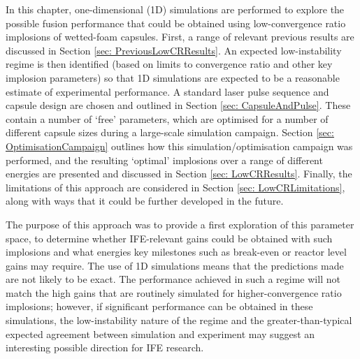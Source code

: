 In this chapter, one-dimensional (1D) simulations are performed to explore the possible fusion performance that could be obtained using low-convergence ratio implosions of wetted-foam capsules. First, a range of relevant previous results are discussed in Section \ref{sec: PreviousLowCRResults}. An expected low-instability regime is then identified (based on limits to convergence ratio and other key implosion parameters) so that 1D simulations are expected to be a reasonable estimate of experimental performance. A standard laser pulse sequence and capsule design are chosen and outlined in Section \ref{sec: CapsuleAndPulse}. These contain a number of `free' parameters, which are optimised for a number of different capsule sizes during a large-scale simulation campaign. Section \ref{sec: OptimisationCampaign} outlines how this simulation/optimisation campaign was performed, and the resulting `optimal' implosions over a range of different energies are presented and discussed in Section \ref{sec: LowCRResults}. Finally, the limitations of this approach are considered in Section \ref{sec: LowCRLimitations}, along with ways that it could be further developed in the future.

The purpose of this approach was to provide a first exploration of this parameter space, to determine whether IFE-relevant gains could be obtained with such implosions and what energies key milestones such as break-even or reactor level gains may require. The use of 1D simulations means that the predictions made are not likely to be exact. The performance achieved in such a regime will not match the high gains that are routinely simulated for higher-convergence ratio implosions; however, if significant performance can be obtained in these simulations, the low-instability nature of the regime and the greater-than-typical expected agreement between simulation and experiment may suggest an interesting possible direction for IFE research.


